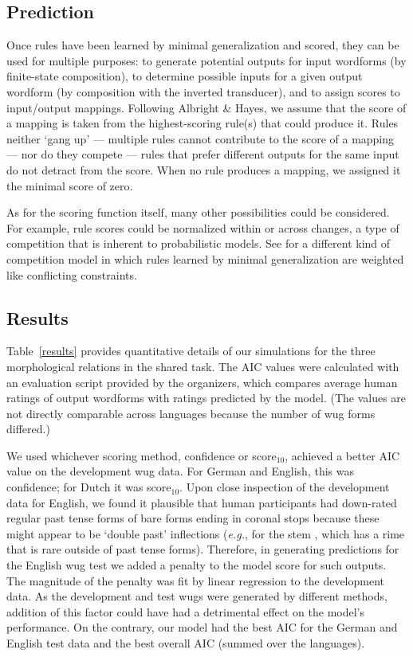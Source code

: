 \documentclass[11pt]{article}
\begin{document}
\subsection{Prediction}

Once rules have been learned by minimal generalization and scored, they can be used for multiple purposes: to generate potential outputs for input wordforms (by finite-state composition), to determine possible inputs for a given output wordform (by composition with the inverted transducer), and to assign scores to input/output mappings. Following Albright \& Hayes, we assume that the score of a mapping is taken from the highest-scoring rule(s) that could produce it. Rules neither `gang up' --- multiple rules cannot contribute to the score of a mapping --- nor do they compete --- rules that prefer different outputs for the same input do not detract from the score. When no rule produces a mapping, we assigned it the minimal score of zero.

As for the scoring function itself, many other possibilities could be considered. For example, rule scores could be normalized within or across changes, a type of competition that is inherent to probabilistic models. See \citet{albright2006} for a different kind of competition model in which rules learned by minimal generalization are weighted like conflicting constraints.

\subsection{Results}

Table~\ref{results} provides quantitative details of our simulations for the three morphological relations in the shared task. The AIC values were calculated with an evaluation script provided by the organizers, which compares average human ratings of output wordforms with ratings predicted by the model. (The values are not directly comparable across languages because the number of wug forms differed.)

We used whichever scoring method, confidence or score$_{10}$, achieved a better AIC value on the development wug data. For German and English, this was confidence; for Dutch it was score$_{10}$. Upon close inspection of the development data for English, we found it plausible that human participants had down-rated regular past tense forms of bare forms ending in coronal stops  because these might appear to be `double past' inflections (\emph{e.g.},  for the stem , which has a rime  that is rare outside of past tense forms). Therefore, in generating predictions for the English wug test we added a penalty to the model score for such outputs. The magnitude of the penalty was fit by linear regression to the development data. As the development and test wugs were generated by different methods, addition of this factor could have had a detrimental effect on the model's performance. On the contrary, our model had the best AIC for the German and English test data and the best overall AIC (summed over the languages).
\end{document}
